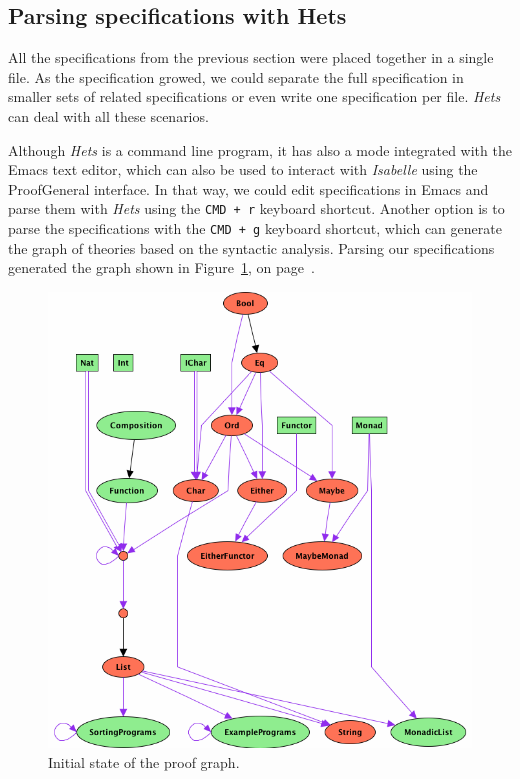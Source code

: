 \documentclass[12pt,twoside]{article}
\numberwithin{spec}{subsection}
\numberwithin{proof}{subsection}
\numberwithin{figure}{subsection}
\numberwithin{code}{subsection}
\newcommand{\citeFig}[1]{Figure~\ref{#1}, on page~\pageref{#1}}
\begin{document}
\subsection{Parsing specifications with Hets}
All the specifications from the previous section were placed together in a single file. As the specification growed, we could separate the full specification in smaller sets of related specifications or even write one specification per file. \textit{Hets} can deal with all these scenarios.

Although \textit{Hets} is a command line program, it has also a mode integrated with the Emacs text editor, which can also be used to interact with \textit{Isabelle} using the ProofGeneral interface. In that way, we could edit specifications in Emacs and parse them with \textit{Hets} using the \verb.CMD + r. keyboard shortcut. Another option is to parse the specifications with the \verb.CMD + g. keyboard shortcut, which can generate the graph of theories based on the syntactic analysis. Parsing our specifications generated the graph shown in \citeFig{fig:Start}.

\begin{figure}[p]
\includegraphics[scale=0.7]{ProofStart}
\caption{Initial state of the proof graph.}
\label{fig:Start}
\end{figure}
\end{document}
